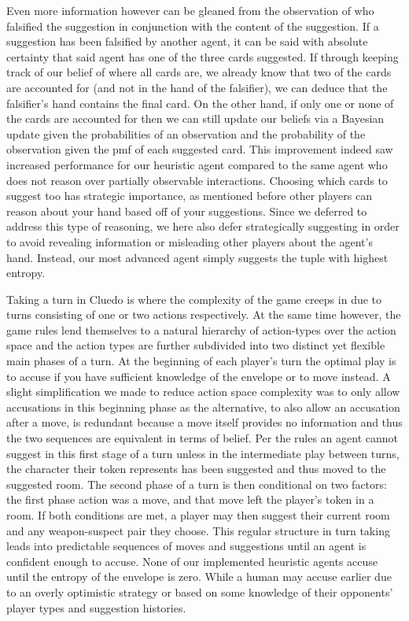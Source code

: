 \documentclass[msc, deptreport, ai, romanprepages]{infthesis}
\begin{document}
Even more information however can be gleaned from the observation of who falsified the suggestion in conjunction with the content of the suggestion. If a suggestion has been falsified by another agent, it can be said with absolute certainty that said agent has one of the three cards suggested. If through keeping track of our belief of where all cards are, we already know that two of the cards are accounted for (and not in the hand of the falsifier), we can deduce that the falsifier’s hand contains the final card. On the other hand, if only one or none of the cards are accounted for then we can still update our beliefs via a Bayesian update given the probabilities of an observation and the probability of the observation given the pmf of each suggested card. This improvement indeed saw increased performance for our heuristic agent compared to the same agent who does not reason over partially observable interactions. Choosing which cards to suggest too has strategic importance, as mentioned before other players can reason about your hand based off of your suggestions. Since we deferred to address this type of reasoning, we here also defer strategically suggesting in order to avoid revealing information or misleading other players about the agent’s hand. Instead, our most advanced agent simply suggests the tuple with highest entropy. 

Taking a turn in Cluedo is where the complexity of the game creeps in due to turns consisting of one or two actions respectively. At the same time however, the game rules lend themselves to a natural hierarchy of action-types over the action space and the action types are further subdivided into two distinct yet flexible main phases of a turn. At the beginning of each player’s turn the optimal play is to accuse if you have sufficient knowledge of the envelope or to move instead. A slight simplification we made to reduce action space complexity was to only allow accusations in this beginning phase as the alternative, to also allow an accusation after a move, is redundant because a move itself provides no information and thus the two sequences are equivalent in terms of belief. Per the rules an agent cannot suggest in this first stage of a turn unless in the intermediate play between turns, the character their token represents has been suggested and thus moved to the suggested room. The second phase of a turn is then conditional on two factors: the first phase action was a move, and that move left the player’s token in a room. If both conditions are met, a player may then suggest their current room and any weapon-suspect pair they choose. This regular structure in turn taking leads into predictable sequences of moves and suggestions until an agent is confident enough to accuse. None of our implemented heuristic agents accuse until the entropy of the envelope is zero. While a human may accuse earlier due to an overly optimistic strategy or based on some knowledge of their opponents’ player types and suggestion histories. 
\end{document}
